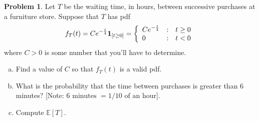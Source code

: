 \documentclass[10pt]{article}
\theoremstyle{definition}
\newtheorem{problem}[theorem]{Problem}
\newcommand{\1}[1]{\textbf{1}_{\left[#1\right]}} %
\def\E{\mathbb{E}} %
\def\P{\mathbb{P}} %
\begin{document}

\begin{problem}%
  Let $T$ be the waiting time, in hours, between successive purchases at a
  furniture store. Suppose that $T$ has pdf
  \begin{equation*}
    f_{T}(t) = C e^{-\frac{t}{4}}\mathbf{1}_{\left[ t \geq 0\right] } = \left\{ \begin{array}{l@{\quad:\quad}l} Ce^{-\frac{t}{4}} & t \geq 0\\ 0& t<0\end{array}\right.
  \end{equation*}
  where $C>0$ is some number that you'll have to determine.
  \begin{enumerate}[(a)]
    \item Find a value of $C$ so that $f_{T}(t)$ is a valid pdf.
    \item What is the probability that the time between purchases is greater
    than $6$ minutes? [Note: $6\text{ minutes }= 1/10\text{ of an hour}$].
    \item Compute $\E\left[T \right]$.
  \end{enumerate}
\end{problem}

\end{document}
